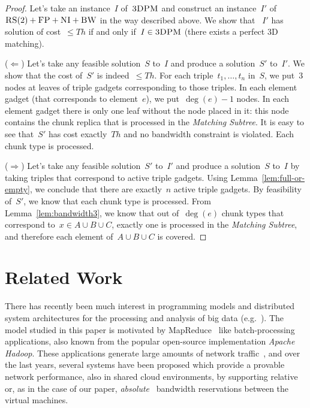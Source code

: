 \documentclass[preprint,12pt]{elsarticle}
\newcommand{\CC}{\textsc{NI}}
\newcommand{\FP}{\textsc{FP}}
\newcommand{\RS}{\textsc{RS}}
\newcommand{\BW}{\textsc{BW}}
\newcommand{\TDPM}{\textsc{3DPM}}
\newcommand{\MatchSubtree}{{\emph{Matching Subtree}}}
\newcommand{\Thr}{\ensuremath{Th}}
\newcommand{\Sol}{\ensuremath{S}}
\begin{document}
\begin{proof}
  Let's take an instance~$I$ of~$\TDPM$ and construct an instance~$I'$
  of~$\RS(2)+\FP+\CC+\BW$ in the way described above.  We show that
 ~$I'$ has solution of cost~$\leq \Thr$ if and only if~$I \in \TDPM$
  (there exists a perfect 3D matching).

  ($\Leftarrow$) Let's take any feasible solution~$\Sol$ to~$I$ and
  produce a solution~$\Sol'$ to~$I'$. We show that the cost of~$\Sol'$ is
  indeed~$\leq \Thr$.
  For each triple~$t_1,\ldots, t_n$ in~$\Sol$, we put~$3$ nodes at
  leaves of triple gadgets corresponding to those triples.  In each
  element gadget (that corresponds to element~$e$), we put~$\deg(e)-1$
  nodes. In each element gadget there is only one leaf without the
  node placed in it: this node contains the chunk replica that is
  processed in the {\MatchSubtree}.
  It is easy to see that~$\Sol'$ has cost exactly~$\Thr$ and no
  bandwidth constraint is violated. Each chunk type is processed.

  ($\Rightarrow$) Let's take any feasible solution~$\Sol'$ to~$I'$ and
  produce a solution~$\Sol$ to~$I$ by taking triples that correspond
  to active triple gadgets. Using Lemma~\ref{lem:full-or-empty}, we
  conclude that there are exactly~$n$ active triple gadgets. By
  feasibility of~$\Sol'$, we know that each chunk type is
  processed. From Lemma~\ref{lem:bandwidth3}, we know that out
  of~$\deg(e)$ chunk types that correspond to~$x\in A\cup B\cup C$,
  exactly one is processed in the {\MatchSubtree}, and therefore each
  element of~$A\cup B\cup C$ is covered.
\end{proof}

\section{Related Work}\label{sec:relwork}

There has recently been much interest in programming models and distributed
system architectures for the processing and analysis of big data (e.g.~\cite{nodb,mapreduce,shark}). The model studied in
this paper is motivated by MapReduce~\cite{mapreduce} like batch-processing applications, also known
from the popular open-source implementation \emph{Apache Hadoop}.
These applications
generate large amounts of network traffic~\cite{orchestra,talk-about,amazonbw},
and over the last years, several systems have been proposed which provide
a provable network performance, also in shared cloud environments, by supporting
relative~\cite{faircloud,elasticswitch,seawall}
or, as in the case of our paper, \emph{absolute}~\cite{oktopus,secondnet,drl,gatekeeper,proteus} bandwidth reservations
between the virtual machines.
\end{document}
